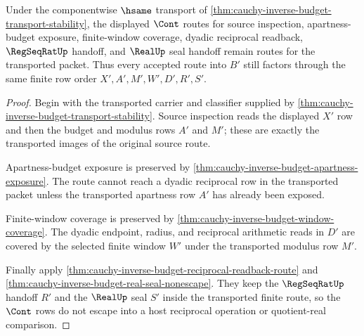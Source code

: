 \begin{theorem}
\label{thm:cauchy-inverse-budget-route-stability}
Under the componentwise $\hsame$ transport of \autoref{thm:cauchy-inverse-budget-transport-stability}, the displayed $\Cont$ routes for source inspection, apartness-budget exposure, finite-window coverage, dyadic reciprocal readback, $\RegSeqRatUp$ handoff, and $\RealUp$ seal handoff remain routes for the transported packet. Thus every accepted route into $B'$ still factors through the same finite row order $X',A',M',W',D',R',S'$.
\end{theorem}
\begin{proof}
Begin with the transported carrier and classifier supplied by \autoref{thm:cauchy-inverse-budget-transport-stability}. Source inspection reads the displayed $X'$ row and then the budget and modulus rows $A'$ and $M'$; these are exactly the transported images of the original source route.

Apartness-budget exposure is preserved by \autoref{thm:cauchy-inverse-budget-apartness-exposure}. The route cannot reach a dyadic reciprocal row in the transported packet unless the transported apartness row $A'$ has already been exposed.

Finite-window coverage is preserved by \autoref{thm:cauchy-inverse-budget-window-coverage}. The dyadic endpoint, radius, and reciprocal arithmetic reads in $D'$ are covered by the selected finite window $W'$ under the transported modulus row $M'$.

Finally apply \autoref{thm:cauchy-inverse-budget-reciprocal-readback-route} and \autoref{thm:cauchy-inverse-budget-real-seal-nonescape}. They keep the $\RegSeqRatUp$ handoff $R'$ and the $\RealUp$ seal $S'$ inside the transported finite route, so the $\Cont$ rows do not escape into a host reciprocal operation or quotient-real comparison.
\end{proof}

